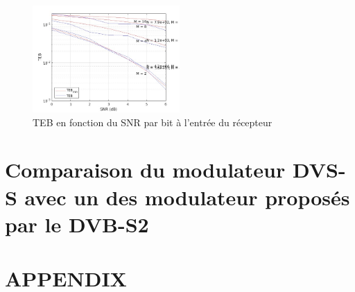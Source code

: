 \documentclass[a4paper, 12pt]{article}
\begin{document}
\subsection{}
\begin{figure}[H]
    \centering
    \includegraphics[width=0.5\textwidth]{graphics/2-5.jpg}
    \caption{TEB en fonction du SNR par bit à l'entrée du récepteur}
    \label{fig:mon_etiquette}
\end{figure}

\subsection{}

\clearpage
\section{Comparaison du modulateur DVS-S avec un des modulateur proposés par le DVB-S2}



\clearpage
\appendix
\section{APPENDIX}
\end{document}
